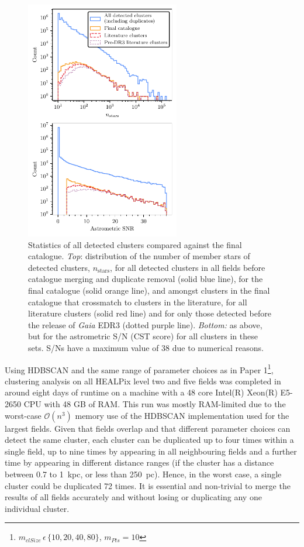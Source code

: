 \begin{figure}[p]
   \centering
   \includegraphics[width=0.6\textwidth]{fig/c3/fig_data_csts.pdf}
   \caption[Statistics of all detected clusters compared against the final catalogue]{Statistics of all detected clusters compared against the final catalogue. \emph{Top}: distribution of the number of member stars of detected clusters, $n_\text{stars}$, for all detected clusters in all fields before catalogue merging and duplicate removal (solid blue line), for the final catalogue (solid orange line), and amongst clusters in the final catalogue that crossmatch to clusters in the literature, for all literature clusters (solid red line) and for only those detected before the release of \emph{Gaia} EDR3 (dotted purple line). \emph{Bottom:} as above, but for the astrometric S/N (CST score) for all clusters in these sets. S/Ns have a maximum value of 38 due to numerical reasons.}%
   \label{c3:fig:cst_histogram}
\end{figure}

Using HDBSCAN and the same range of parameter choices as in Paper 1\footnote{$m_{clSize}\,\epsilon\,\{10,20,40,80\}$, $m_{Pts}=10$}, clustering analysis on all HEALPix level two and five fields was completed in around eight days of runtime on a machine with a 48 core Intel(R) Xeon(R) E5-2650 CPU with 48 GB of RAM. This run was mostly RAM-limited due to the worst-case $\mathcal{O}(n^3)$ memory use of the HDBSCAN implementation used for the largest fields. Given that fields overlap and that different parameter choices can detect the same cluster, each cluster can be duplicated up to four times within a single field, up to nine times by appearing in all neighbouring fields and a further time by appearing in different distance ranges (if the cluster has a distance between 0.7 to 1~kpc, or less than 250~pc). Hence, in the worst case, a single cluster could be duplicated 72 times. It is essential and non-trivial to merge the results of all fields accurately and without losing or duplicating any one individual cluster.

